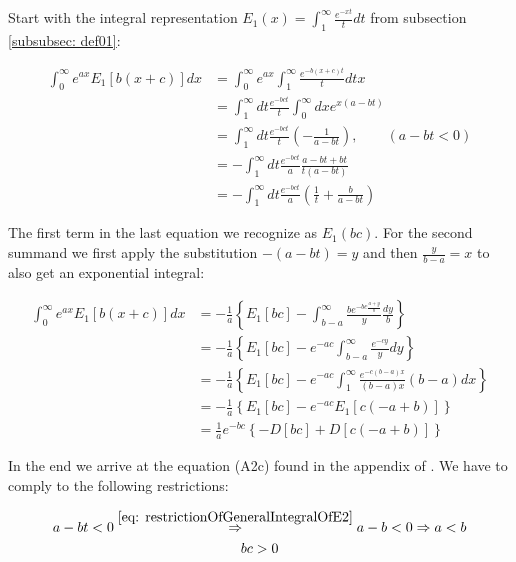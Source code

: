 \documentclass[bibliography=totocnumbered]{scrartcl}
\newcommand{\assume}[1][\text{MISSING PARAMETER}]{,\qquad\left(#1\right)}
\begin{document}
	Start with the integral representation $E_1\left(x\right)=\int_{1}^{\infty}\frac{e^{-xt}}{t}dt$ from subsection \ref{subsubsec: def01}:

	\begin{align}
		\int_{0}^{\infty}e^{ax}E_1\left[b\left(x+c\right)\right]dx&=\int_{0}^{\infty}e^{ax}\int_{1}^{\infty}\frac{e^{-b\left(x+c\right)t}}{t}dtx\\
		&=\int_{1}^{\infty}dt\frac{e^{-bct}}{t}\int_{0}^{\infty}dxe^{x\left(a-bt\right)}\\
		&=\int_{1}^{\infty}dt\frac{e^{-bct}}{t}\left(-\frac{1}{a-bt}\right)\assume[a-bt<0]\label{eq: restrictionOfGeneralIntegralOfE2}\\
		&=-\int_{1}^{\infty}dt\frac{e^{-bct}}{a}\frac{a-bt+bt}{t\left(a-bt\right)}\\
		&=-\int_{1}^{\infty}dt\frac{e^{-bct}}{a}\left(\frac{1}{t}+\frac{b}{a-bt}\right)
	\end{align}

	The first term in the last equation we recognize as $E_1\left(bc\right)$. For the second summand we first apply the substitution $-\left(a-bt\right)=y$ and then $\frac{y}{b-a}=x$ to also get an exponential integral:

	\begin{align}
		\int_{0}^{\infty}e^{ax}E_1\left[b\left(x+c\right)\right]dx&=-\frac{1}{a}\left\{E_1\left[bc\right]-\int_{b-a}^{\infty}\frac{be^{-bc\frac{a+y}{b}}}{y}\frac{dy}{b}\right\}\\
		&=-\frac{1}{a}\left\{E_1\left[bc\right]-e^{-ac}\int_{b-a}^{\infty}\frac{e^{-cy}}{y}dy\right\}\\
		&=-\frac{1}{a}\left\{E_1\left[bc\right]-e^{-ac}\int_{1}^{\infty}\frac{e^{-c\left(b-a\right)x}}{\left(b-a\right)x}\left(b-a\right)dx\right\}\\
		&=-\frac{1}{a}\left\{E_1\left[bc\right]-e^{-ac}E_1\left[c\left(-a+b\right)\right]\right\}\\
		&=\frac{1}{a}e^{-bc}\left\{-D\left[bc\right]+D\left[c\left(-a+b\right)\right]\right\}\label{eq: generalIntegralOfE2}
	\end{align}

	In the end we arrive at the equation (A2c) found in the appendix of \cite{boer1990calc}. We have to comply to the following restrictions:

	\begin{subequations}
		\begin{gather}
			a-bt<0\overset{\eqref{eq: restrictionOfGeneralIntegralOfE2}}{\Rightarrow}a-b<0\Rightarrow{}a<b\\
			bc>0
		\end{gather}
	\end{subequations}
\end{document}
